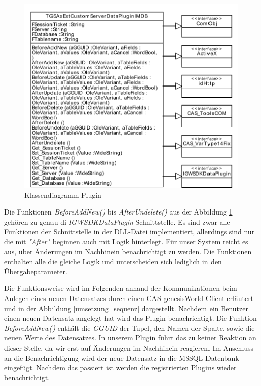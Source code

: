 \begin{figure}[htbp]
\centering
\includegraphics[scale=0.7]{pics/plugin_klassendiagramm.pdf}
\caption{Klassendiagramm Plugin}
\label{ergebniss_plugin_klassendiagramm}
\end{figure}

Die Funktionen \textit{BeforeAddNew()} bis \textit{AfterUndelete()} aus der Abbildung \ref{ergebniss_plugin_klassendiagramm} gehören zu genau di \textit{IGWSDKDataPlugin} Schnittstelle. Es sind zwar alle Funktionen der Schnittstelle in der DLL-Datei implementiert, allerdings sind nur die mit \textit{"After"} beginnen auch mit Logik hinterlegt. Für unser System reicht es aus, über Änderungen im Nachhinein benachrichtigt zu werden. Die Funktionen enthalten alle die gleiche Logik und unterscheiden sich lediglich in den Übergabeparameter.

Die Funktionsweise wird im Folgenden anhand der Kommunikationen beim Anlegen eines neuen Datensatzes durch einen CAS genesisWorld Client erläutert und in der Abbildung \ref{umsetzung_sequenz} dargestellt. Nachdem ein Benutzer einen neuen Datensatz angelegt hat wird das Plugin benachrichtigt. Die Funktion \textit{BeforeAddNew()} enthält die \textit{GGUID} der Tupel, den Namen der Spalte, sowie die neuen Werte des Datensatzes. In unserem Plugin führt das zu keiner Reaktion an dieser Stelle, da wir erst auf Änderungen im Nachhinein reagieren. Im Anschluss an die Benachrichtigung wird der neue Datensatz in die MSSQL-Datenbank eingefügt. Nachdem das passiert ist werden die registrierten Plugins wieder benachrichtigt.

